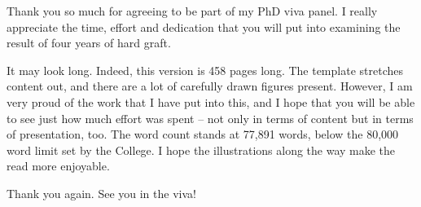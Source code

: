 
\begin{preamble}

Thank you so much for agreeing to be part of my PhD viva panel. I really appreciate the time, effort and dedication that you will put into examining the result of four years of hard graft.

It may look long. Indeed, this version is 458 pages long. The template stretches content out, and there are a lot of carefully drawn figures present. However, I am very proud of the work that I have put into this, and I hope that you will be able to see just how much effort was spent -- not only in terms of content but in terms of presentation, too. The word count stands at 77,891 words, below the 80,000 word limit set by the College. I hope the illustrations along the way make the read more enjoyable.

Thank you again. See you in the viva!
\end{preamble}